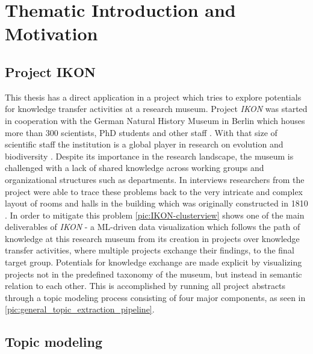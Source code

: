 %
\chapter{Thematic Introduction and Motivation}
\label{chap:introduction}

\section{Project IKON}

This thesis has a direct application in a project which tries to explore potentials for knowledge transfer activities at a research museum. Project \textit{IKON} was started in cooperation with the German Natural History Museum in Berlin which houses more than 300 scientists, PhD students and other staff \cite{Team2018}. With that size of scientific staff the institution is a global player in research on evolution and biodiversity \cite{IntroducingMuseumFur}. Despite its importance in the research landscape, the museum is challenged with a lack of shared knowledge across working groups and organizational structures such as departments. In interviews researchers from the project were able to trace these problems back to the very intricate and complex layout of rooms and halls in the building which was originally constructed in 1810 \cite{140JahreAltes2018}. In order to mitigate this problem \autoref{pic:IKON-clusterview} shows one of the main deliverables of \textit{IKON} - a ML-driven data visualization which follows the path of knowledge at this research museum from its creation in projects over knowledge transfer activities, where multiple projects exchange their findings, to the final target group. Potentials for knowledge exchange are made explicit by visualizing projects not in the predefined taxonomy of the museum, but instead in semantic relation to each other. This is accomplished by running all project abstracts through a topic modeling process consisting of four major components, as seen in \autoref{pic:general_topic_extraction_pipeline}. 

\section{Topic modeling}

